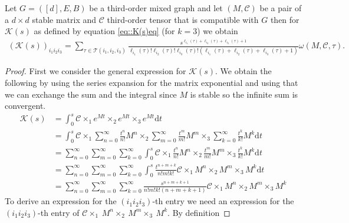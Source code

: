 \documentclass{biometrika}
\begin{document}
\begin{proposition}
\label{prop::ThirdOrderTrekwithS}
    Let $G = ([d],E,B)$ be a third-order mixed graph and let $(M,\mathcal{C})$ be a pair of a $d\times d$ stable matrix and $\mathcal{C}$ third-order tensor that is compatible with $G$ then for $\mathcal{K}(s)$ as defined by equation \eqref{eq::K(s)eq} (for $k = 3$) we obtain 
    \begin{align*}
        (\mathcal{K} (s))_{i_1 i_2 i_3} =  \sum_{\tau \in \mathcal{T}(i_1, i_2, i_3)} 
    \frac{s^{\ell_{i_1}(\tau)+\ell_{i_2}(\tau)+\ell_{i_3}(\tau)+1}}{\ell_{i_1}(\tau)! \ell_{i_2}(\tau)! \ell_{i_3}(\tau)! (\ell_{i_1}(\tau)+\ell_{i_2}(\tau)+\ell_{i_3}(\tau)+1)}   
    \omega(M,\mathcal{C},\tau).
    \end{align*}
\end{proposition}
\begin{proof}
    First we consider the general expression for $\mathcal{K}(s)$. We obtain the following by using the series expansion for the matrix exponential
    and using that we can exchange the sum and the integral since $M$ is stable so the infinite sum is convergent. 
    \begin{align*}
        \mathcal{K} (s) &= \int_{0}^{s} \mathcal{C} \times_1 e^{M t} \times_2 e^{M t} \times_3  e^{M t} \mathrm{d} t \\ 
               &=  \int_{0}^{s} \mathcal{C} \times_1 \sum_{n = 0}^{\infty} \frac{t^n}{n!} M^n \times_2 
               \sum_{m = 0}^{\infty} \frac{t^m}{m!} M^m \times_3  \sum_{k = 0}^{\infty} \frac{t^k}{k!} M^k \mathrm{d} t \\ 
               &= \sum_{n = 0}^{\infty} \sum_{m = 0}^{\infty} \sum_{k = 0}^{\infty} \int_{0}^{s} \mathcal{C} \times_1 \frac{t^n}{n!} M^n 
               \times_2 \frac{t^m}{m!} M^m \times_3 \frac{t^k}{k!} M^k \mathrm{d} t \\ 
               &= \sum_{n = 0}^{\infty} \sum_{m = 0}^{\infty} \sum_{k = 0}^{\infty} \int_{0}^{s} \frac{t^{n+m+k}}{n! m! k!}  
               \mathcal{C} \times_1  M^n \times_2 M^m \times_3  M^k \mathrm{d} t \\ 
               &= \sum_{n = 0}^{\infty} \sum_{m = 0}^{\infty} \sum_{k = 0}^{\infty}  \frac{s^{n+m+k+1}}{n! m! k! (n+m+k+1)} 
               \mathcal{C} \times_1  M^n \times_2 M^m \times_3  M^k
    \end{align*}
    To derive an expression for the $(i_1 i_2  i_3)$-th entry we need an expression for the $(i_1 i_2  i_3)$-th  entry of $\mathcal{C}\times_1~M^n\times_2~M^m\times_3~M^k$. By definition

\end{proof}
\end{document}
